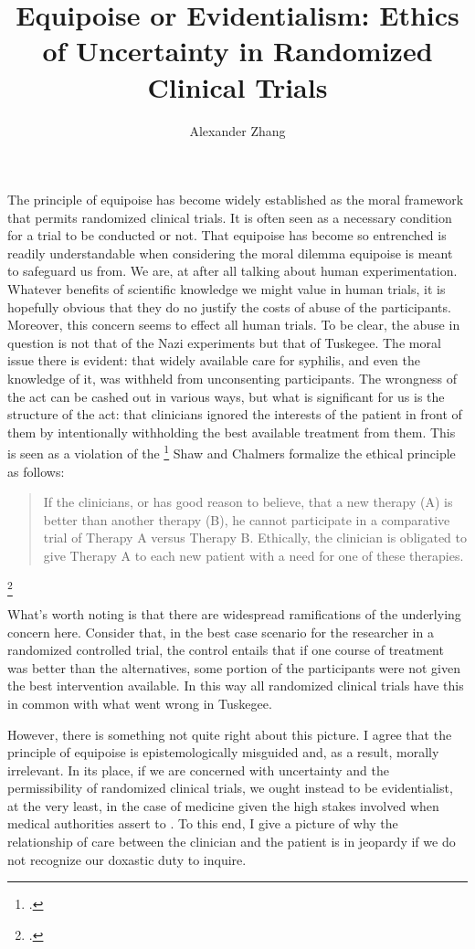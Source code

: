 \documentclass[letterpaper,notitlepage,12pt]{article}
\title{Equipoise or Evidentialism: Ethics of Uncertainty in Randomized Clinical
Trials}
\author{Alexander Zhang}
\date{}
\begin{document}
\maketitle

The principle of equipoise has become widely established as the moral framework
that permits randomized clinical trials.
It is often seen as a necessary condition for a trial to be conducted or not.
That equipoise has become so entrenched is readily understandable when
considering the moral dilemma equipoise is meant to safeguard us from. We are,
at after all talking about human experimentation.
Whatever benefits of scientific knowledge we might value in human trials, it is
hopefully obvious that they do no justify the costs of abuse of the
participants.
Moreover, this concern seems to effect all human trials.
To be clear, the abuse in question is not that of the Nazi experiments but that
of Tuskegee.
The moral issue there is evident: that widely available care for syphilis, and
even the knowledge of it, was withheld from unconsenting participants.
The wrongness of the act can be cashed out in various ways, but what is
significant for us is the structure of the act: that clinicians ignored the
interests of the patient in front of them by intentionally withholding the best
available treatment from them.
This is seen as a violation of the \footcite[p. 487]{shaw_ethics_1970}
Shaw and Chalmers formalize the ethical principle as follows:
\blockquote{If the clinicians, or has good reason to believe, that a new
  therapy (A) is better than another therapy (B), he cannot participate in a
  comparative trial of Therapy A versus Therapy B. Ethically, the clinician is
  obligated to give Therapy A to each new patient with a need for one of these
therapies.}\footcite[p. 487]{shaw_ethics_1970}

What's worth noting is that there are widespread ramifications of the
underlying concern here.
Consider that, in the best case scenario for the researcher in a randomized
controlled trial, the control entails that if one course of treatment was better
than the alternatives, some portion of the participants were not given the best
intervention available.
In this way all randomized clinical trials have this in common with what went
wrong in Tuskegee.

However, there is something not quite right about this picture.
I agree that the principle of equipoise is epistemologically misguided and, as a
result, morally irrelevant.
In its place, if we are concerned with uncertainty and the permissibility of
randomized clinical trials, we ought instead to be evidentialist, at the very
least, in the case of medicine given the high stakes involved when medical
authorities assert to .
To this end, I give a picture of why the relationship of care between the
clinician and the patient is in jeopardy if we do not recognize our doxastic
duty to inquire.
\end{document}
